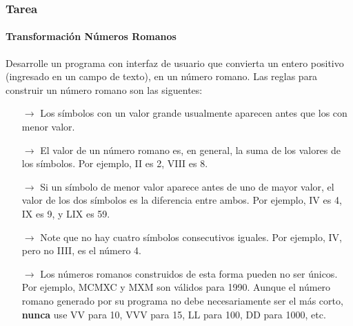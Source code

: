 \documentclass{beamer}
\begin{document}
    \begin{frame}
		\frametitle{Tarea}
        \framesubtitle{Transformaci\'on N\'umeros Romanos}
        {\scriptsize
        Desarrolle un programa con interfaz de usuario que convierta un entero positivo (ingresado en un campo de texto), en un n\'umero romano. Las reglas para construir un n\'umero romano son las siguentes:

		\begin{itemize}
			\item[$\rightarrow$] Los s\'imbolos con un valor grande usualmente aparecen antes que los con menor valor.
			\item[$\rightarrow$] El valor de un n\'umero romano es, en general, la suma de los valores de los s\'imbolos. Por ejemplo, II es 2, VIII es 8.
			\item[$\rightarrow$] Si un s\'imbolo de menor valor aparece antes de uno de mayor valor, el valor de los dos s\'imbolos es la diferencia entre ambos. Por ejemplo, IV es 4, IX es 9, y LIX es 59.
			\item[$\rightarrow$] Note que no hay cuatro s\'imbolos consecutivos iguales. Por ejemplo, IV, pero no IIII, es el n\'umero 4.
			\item[$\rightarrow$] Los n\'umeros romanos construidos de esta forma pueden no ser \'unicos. Por ejemplo, MCMXC y MXM son v\'alidos para 1990. Aunque el n\'umero romano generado por su programa no debe necesariamente ser el m\'as corto, \textbf{nunca} use VV para 10, VVV para 15, LL para 100, DD para 1000, etc.
		\end{itemize}}
	\end{frame}
\end{document}
